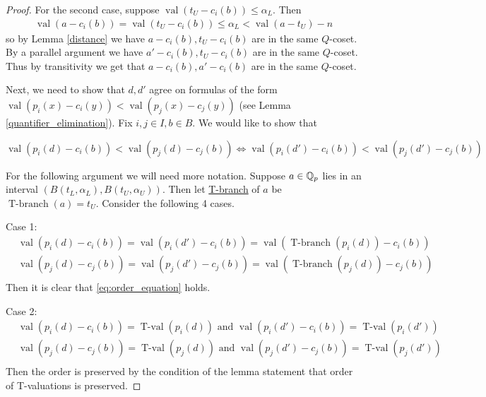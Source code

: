 \documentclass{amsart}
\newcommand{\paren}[1]{\left(#1\right)}
\DeclareMathOperator{\val}{val}
\DeclareMathOperator{\vval}{val}
\DeclareMathOperator{\tval}{T-val}
\DeclareMathOperator{\tbr}{T-branch}
\newcommand{\defn}{\underline}
\begin{document}
\begin{proof}
  For the second case, suppose $\val(t_U - c_i(b)) \leq \alpha_L$.
  Then
  \begin{align*}
    \val(a - c_i(b)) = \val(t_U - c_i(b)) \leq \alpha_L < \val(a - t_U) - n
  \end{align*}
  so by Lemma \ref{distance} we have $a - c_i(b), t_U - c_i(b)$ are in the same $Q$-coset.
  By a parallel argument we have $a' - c_i(b), t_U - c_i(b)$ are in the same $Q$-coset.
  Thus by transitivity we get that $a - c_i(b), a' - c_i(b)$ are in the same $Q$-coset.

  Next, we need to show that $d, d'$ agree on formulas of the form
  $\vval (p_i(x) - c_i(y)) < \vval (p_j(x) - c_j(y))$ 
  (see Lemma \ref{quantifier_elimination}).
  Fix $i,j \in I, b \in B$.
  We would like to show that 

  \begin{equation} \label {eq:order_equation}
    \vval (p_i(d) - c_i(b)) < \vval (p_j(d) - c_j(b))  \iff \vval (p_i(d') - c_i(b)) < \vval (p_j(d') - c_j(b))
  \end{equation}

  For the following argument we will need more notation.
  Suppose $a \in \mathbb{Q}_p$ lies in an interval $\paren{B(t_L, \alpha_L),  B(t_U, \alpha_U)}$.
  Then let \defn{T-branch} of $a$ be $\tbr(a) = t_U$.    
  Consider the following 4 cases.

  Case 1:
  \begin{align*}
    &\vval (p_i(d) - c_i(b)) = \vval (p_i(d') - c_i(b)) = \vval(\tbr(p_i(d)) - c_i(b)) \\
    &\vval (p_j(d) - c_j(b)) = \vval (p_j(d') - c_j(b)) = \vval(\tbr(p_j(d)) - c_j(b))  \\
  \end{align*}
  Then it is clear that \eqref{eq:order_equation} holds.

  Case 2:
  \begin{align*}
    &\vval (p_i(d) - c_i(b)) = \tval(p_i(d)) \text{ and } \vval (p_i(d') - c_i(b)) = \tval(p_i(d')) \\
    &\vval (p_j(d) - c_j(b)) = \tval(p_j(d)) \text{ and } \vval (p_j(d') - c_j(b)) = \tval(p_j(d')) \\
  \end{align*}
  Then the order is preserved by the condition of the lemma statement that order of T-valuations is preserved.


\end{proof}
\end{document}
